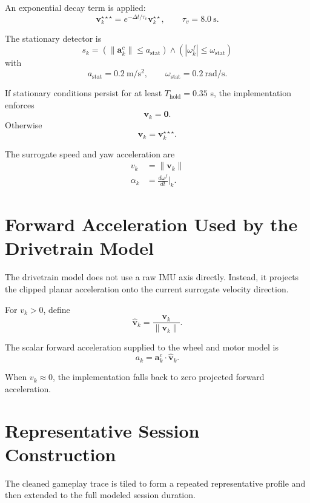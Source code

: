 \documentclass[11pt]{article}
\begin{document}
An exponential decay term is applied:
\begin{equation}
\bm{v}^{\star\star\star}_k = e^{-\Delta t / \tau_v} \bm{v}^{\star\star}_k,
\qquad
\tau_v = 8.0 \ \mathrm{s}.
\end{equation}

The stationary detector is
\begin{equation}
s_k =
\left( \|\bm{a}^c_k\| \le a_{\mathrm{stat}} \right)
\land
\left( |\omega^f_k| \le \omega_{\mathrm{stat}} \right)
\end{equation}
with
\begin{equation}
a_{\mathrm{stat}} = 0.2 \ \mathrm{m/s^2},
\qquad
\omega_{\mathrm{stat}} = 0.2 \ \mathrm{rad/s}.
\end{equation}

If stationary conditions persist for at least \(T_{\mathrm{hold}} = 0.35\) s, the implementation enforces
\begin{equation}
\bm{v}_k = \bm{0}.
\end{equation}
Otherwise
\begin{equation}
\bm{v}_k = \bm{v}^{\star\star\star}_k.
\end{equation}

The surrogate speed and yaw acceleration are
\begin{align}
v_k &= \|\bm{v}_k\| \\
\alpha_k &= \frac{d\omega^f}{dt}\Big|_k.
\end{align}

\section{Forward Acceleration Used by the Drivetrain Model}
The drivetrain model does not use a raw IMU axis directly. Instead, it projects the clipped planar acceleration onto the current surrogate velocity direction.

For \(v_k > 0\), define
\begin{equation}
\hat{\bm{v}}_k = \frac{\bm{v}_k}{\|\bm{v}_k\|}.
\end{equation}

The scalar forward acceleration supplied to the wheel and motor model is
\begin{equation}
a_k = \bm{a}^c_k \cdot \hat{\bm{v}}_k.
\end{equation}

When \(v_k \approx 0\), the implementation falls back to zero projected forward acceleration.

\section{Representative Session Construction}
The cleaned gameplay trace is tiled to form a repeated representative profile and then extended to the full modeled session duration.
\end{document}
